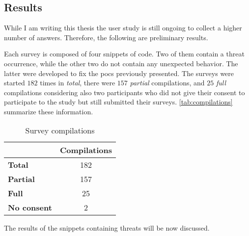\subsection{Results}
\label{sec:userstudyresults}
While I am writing this thesis the user study is still ongoing to collect a higher number of answers. Therefore, the following are preliminary results.

Each survey is composed of four snippets of code. Two of them contain a threat occurrence, while the other two do not contain any unexpected behavior. The latter were developed to fix the \glspl{poc} previously presented. The surveys were started $182$ times in \textit{total}, there were $157$ \textit{partial} compilations, and $25$ \textit{full} compilations considering also two participants who did not give their consent to participate to the study but still submitted their surveys. \autoref{tab:compilations} summarize these information. 

\begin{table}[h!]
    \centering
    \begin{tabular}{| l | c |}
    \hline
    & \textbf{Compilations}\\
    \hline
    \textbf{Total} & 182\\
    \hline
    \textbf{Partial} & 157\\
    \hline
    \textbf{Full} & 25\\
    \hline
    \textbf{No consent} & 2\\
    \hline
    \end{tabular}
    \caption{Survey compilations}
    \label{tab:compilations}
\end{table}

The results of the snippets containing threats will be now discussed.

